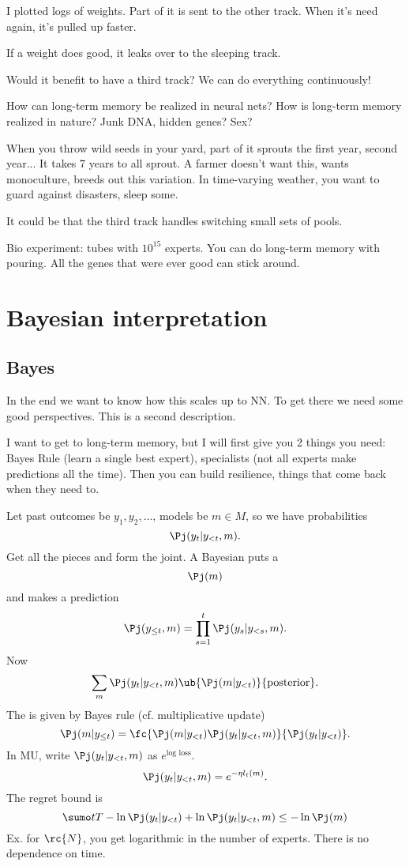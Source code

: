 I plotted logs of weights. Part of it is sent to the other track. When it's need again, it's pulled up faster. 

If a weight does good, it leaks over to the sleeping track. 

Would it benefit to have a third track? We can do everything continuously!

How can long-term memory be realized in neural nets? How is long-term memory realized in nature? Junk DNA, hidden genes? Sex?

When you throw wild seeds in your yard, part of it sprouts the first year, second year... It takes 7 years to all sprout. A farmer doesn't want this, wants monoculture, breeds out this variation.
In time-varying weather, you want to guard against disasters, sleep some.

It could be that the third track handles switching small sets of pools.

Bio experiment: tubes with $10^{15}$ experts. You can do long-term memory with pouring. All the genes that were ever good can stick around.

\section{Bayesian interpretation}

\subsection{Bayes}
In the end we want to know how this scales up to NN. To get there we need some good perspectives. This is a second description.

I want to get to long-term memory, but I will first give you 2 things you need: Bayes Rule (learn a single best expert), specialists (not all experts make predictions all the time). Then you can build resilience, things that come back when they need to.

Let past outcomes be $y_1,y_2,\ldots$, models be $m\in M$, so we have probabilities
$$
\Pj(y_t|y_{<t},m).
$$
Get all the pieces and form the joint. 
A Bayesian puts a  
$$\Pj(m)$$ 
and makes a  prediction
$$
\Pj(y_{\le t}, m) = \prod_{s=1}^t \Pj(y_s|y_{<s},m).
$$
Now 
$$
\sum_m \Pj(y_t|y_{<t}, m) \ub{\Pj(m|y_{<t})}{\text{posterior}}.
$$
The  is given by Bayes rule (cf. multiplicative update)
$$
\Pj(m|y_{\le t}) = \fc{\Pj(m|y_{<t}) \Pj(y_t|y_{<t},m)}{\Pj(y_t|y_{<t})}.
$$
In MU, write $\Pj(y_t|y_{<t},m)$ as $e^{\text{log loss}}$.
$$
\Pj(y_t|y_{<t},m) = e^{-\eta l_t(m)}.
$$
The regret bound is
$$
\sumo tT  - \ln \Pj(y_t|y_{<t}) + \ln \Pj(y_t|y_{<t},m)
\le -\ln \Pj(m)
$$
Ex. for $\rc{N}$, you get logarithmic in the number of experts. There is no dependence on time.
